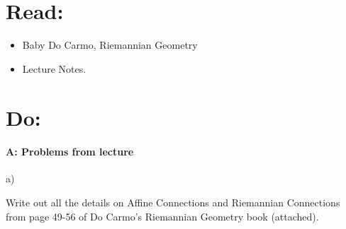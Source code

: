 \documentclass[12pt]{article}
\title{\rightline {\Huge {Due: November, 22}}}
\author{\LARGE {HMC\quad Math 142 \quad Fall 2017} 
\\ {Prof. Gu}  
\\ {\LARGE Problem Set 10}}
\date{Start this assignment before Sunday night!}
\begin{document}
\maketitle

\section*{ Read: } 

\begin{itemize}
\item{Baby Do Carmo, Riemannian Geometry}
\item{Lecture Notes.}
\end{itemize}

\section*{ Do: }

\medskip
\paragraph{A: Problems from lecture}
\begin{itemize}
    {\item a)} Write out all the details on Affine Connections and Riemannian Connections from page 49-56 of Do Carmo's Riemannian Geometry book (attached).
\end{itemize}
\end{document}
